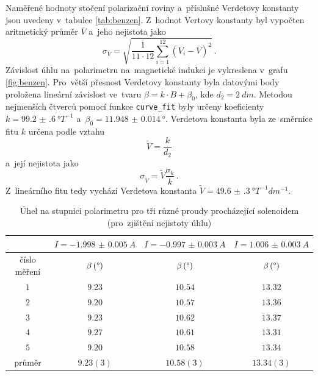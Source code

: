 \documentclass{../concepts/titul_protokol_p/prepareprotokol} %
\newcommand{\relative}[1]{
\frac{\sigma_{#1}}{#1}
}
\begin{document}
Naměřené hodnoty stočení polarizační roviny a~příslušné Verdetovy konstanty jsou uvedeny v~tabulce 
\ref{tab:benzen}. Z~hodnot Vertovy konstanty byl vypočten aritmetický průměr $\overline{V}$ a~jeho nejistota jako
\begin{equation}
    \label{eq:sigma_V_mean}
    \sigma_{\overline{V}} = \sqrt{ \frac{1}{11 \cdot 12} \sum_{i=1}^{12} \left( V_i - \overline{V} \right)^2 } \,.
\end{equation}
Závislost úhlu na~polarimetru na~magnetické
indukci je vykreslena v~grafu \ref{fig:benzen}. Pro~větší přesnost Verdetovy konstanty byla datovými body proložena lineární závislost ve~tvaru
$\beta = k \cdot B + \beta_0$, kde $d_2 = \qty{2}{dm}$. Metodou nejmenších čtverců pomocí funkce \texttt{curve\_fit} 
byly určeny koeficienty $k = \qty{99.2(6)}{\degree T^{-1}}$ a~$\beta_0 = \qty{11.948(14)}{\degree}$.
Verdetova konstanta byla ze~směrnice fitu $k$ určena podle vztahu
\begin{equation}
    \label{eq:V_from_fit}
    \tilde{V} = \frac{k}{d_2}
\end{equation}
a~její nejistota jako
\begin{equation}
    \label{eq:sigma_V_from_fit}
    \sigma_{\tilde{V}} = \tilde{V} \relative{k} \,.
\end{equation}
Z~lineárního fitu tedy vychází Verdetova konstanta $\tilde{V} = \qty{49.6(3)}{\degree T^{-1} dm^{-1}}$.

\begin{table}[!htbp]
\centering
\caption{Úhel na stupnici polarimetru pro tři různé proudy procházející solenoidem (pro~zjištění
nejistoty úhlu)}
\begin{tabular}{cccc}
 \toprule
 & $I = \qty{-1.998(5)}{A}$ & $I = \qty{-0.997(3)}{A}$ & $I = \qty{1.006(3)}{A}$ \\
 \midrule
 číslo měření & $\beta\, (\mathrm{\degree})$ & $\beta\, (\mathrm{\degree})$ & $\beta\, (\mathrm{\degree})$ \\
 \midrule
 $1$ & $9.23$ & $10.54$ & $13.32$ \\
 $2$ & $9.20$ & $10.57$ & $13.36$ \\
 $3$ & $9.23$ & $10.62$ & $13.37$ \\
 $4$ & $9.27$ & $10.61$ & $13.31$ \\
 $5$ & $9.20$ & $10.58$ & $13.34$ \\
 \midrule
 \midrule
 průměr & $9.23(3)$ & $10.58(3)$ & $13.34(3)$ \\
 \bottomrule
\end{tabular}
\label{tab:benzen_nejistota}
\end{table}
\end{document}
